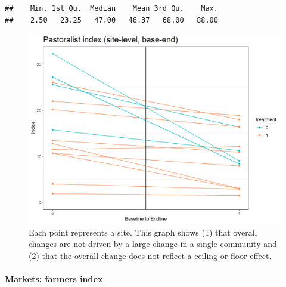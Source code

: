 \documentclass[
]{article}
\begin{document}
\begin{verbatim}
##    Min. 1st Qu.  Median    Mean 3rd Qu.    Max. 
##    2.50   23.25   47.00   46.37   68.00   88.00
\end{verbatim}

\begin{figure}%
\centering
\includegraphics[width=\linewidth]{../obs_dat/b_analysis/market_pasts_siteTime.plot.png}
\caption{Each point represents a site. This graph shows (1) that overall changes are not driven by a large change in a single community and (2) that the overall change does not reflect a ceiling or floor effect.}\label{fig:market_past_siteTime}
\end{figure}

\hypertarget{markets-farmers-index}{%
\paragraph{Markets: farmers index}\label{markets-farmers-index}}
\end{document}

